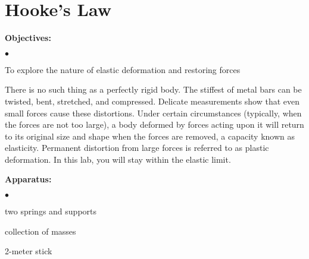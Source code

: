 
\section{Hooke's Law}

\makelabheader %

\medskip
{\noindent \bf Objectives:} \begin{list}{$\bullet$}{\itemsep0pt }

\item To explore the nature of elastic deformation and restoring forces

\end{list}


There is no such thing as a perfectly rigid body. The stiffest of metal bars can be twisted, bent, stretched, and compressed. Delicate measurements show that even small forces cause these distortions. Under certain circumstances (typically, when the forces are not too large), a body deformed by forces acting upon it will return to its original size and shape when the forces are removed, a capacity known as elasticity. Permanent distortion from large forces is referred to as plastic deformation. In this lab, you will stay within the elastic limit.

\medskip
{\noindent \bf Apparatus:} \begin{list}{$\bullet$}{\itemsep0pt }

\item two springs and supports \item collection of masses \item 2-meter stick

\end{list}


